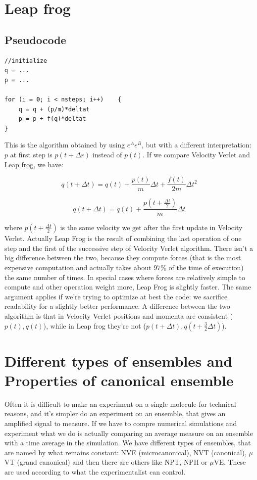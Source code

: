 \documentclass[a4paper, italian, openany]{book}
\begin{document}
\section{Leap frog}

\subsection{Pseudocode}

\begin{lstlisting}
//initialize
q = ... 
p = ...

for (i = 0; i < nsteps; i++)	{
	q = q + (p/m)*deltat
	p = p + f(q)*deltat
}
\end{lstlisting}

This is the algorithm obtained by using $e^A e^B$, but with a different interpretation: $p$ at first step is $p(t+\Delta r)$ instead of $p(t)$. If we compare Velocity Verlet and Leap frog, we have:

$$q(t+\Delta t) = q(t) + \frac{p(t)}{m}\Delta t + \frac{f(t)}{2m}\Delta t^2$$

$$q(t+\Delta t) = q(t) + \frac{p(t+\frac{\Delta t}{2})}{m} \Delta t$$

where $p(t+\frac{\Delta t}{2})$ is the same velocity we get after the first update in Velocity Verlet. Actually Leap Frog is the result of combining the last operation of one step and the first of the successive step of Velocity Verlet algorithm.\newline
There isn't a big difference between the two, because they compute forces (that is the most expensive computation and actually takes about $97\%$ of the time of execution) the same number of times. In special cases where forces are relatively simple to compute and other operation weight more, Leap Frog is slightly faster. The same argument applies if we're trying to optimize at best the code: we sacrifice readability for a slightly better performance.\newline
A difference between the two algorithm is that in Velocity Verlet positions and momenta are consistent ($p(t), q(t)$), while in Leap frog they're not ($p(t+\Delta t), q(t+\frac{3}{2}\Delta t)$).

\section{Different types of ensembles and Properties of canonical ensemble}

Often it is difficult to make an experiment on a single molecule for technical reasons, and it's simpler do an experiment on an ensemble, that gives an amplified signal to measure. If we have to compre numerical simulations and experiment what we do is actually comparing an average measure on an ensemble with a time average in the simulation.\newline
We have different types of ensembles, that are named by what remains constant: NVE (microcanonical), NVT (canonical), $\mu$VT (grand canonical) and then there are others like NPT, NPH or $\mu$VE. These are used according to what the experimentalist can control.
\end{document}
